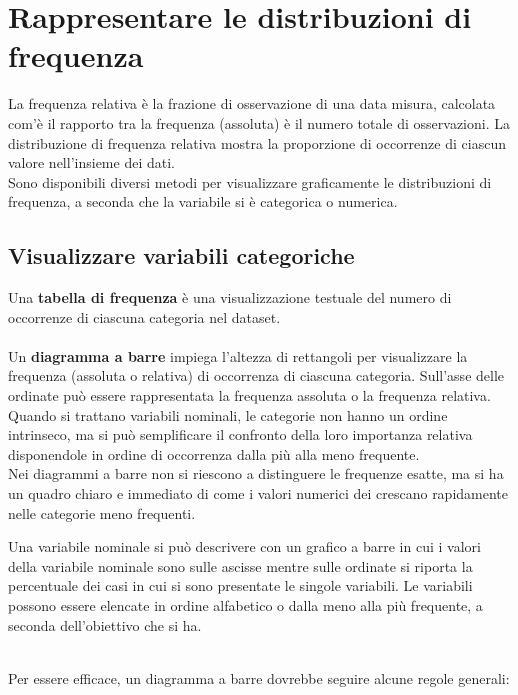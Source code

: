 \documentclass[10pt, draft]{book}
\begin{document}
\section{Rappresentare le distribuzioni di frequenza}
La frequenza relativa è la frazione di osservazione di una data misura, calcolata com'è il rapporto tra la frequenza (assoluta) è il numero totale di osservazioni. La distribuzione di frequenza relativa mostra la proporzione di occorrenze di ciascun valore nell'insieme dei dati.
\\
Sono disponibili diversi metodi per visualizzare graficamente le distribuzioni di frequenza, a seconda che la variabile si è categorica o numerica.

\subsection{Visualizzare variabili categoriche}
Una \textbf{tabella di frequenza} è una visualizzazione testuale del numero di occorrenze di ciascuna categoria nel dataset.
\\
\\
Un \textbf{diagramma a barre} impiega l'altezza di rettangoli per visualizzare la frequenza (assoluta o relativa) di occorrenza di ciascuna categoria. Sull’asse delle ordinate può essere rappresentata la frequenza assoluta o la frequenza relativa.
\\
Quando si trattano variabili nominali, le categorie non hanno un ordine intrinseco, ma si può semplificare il confronto della loro importanza relativa disponendole in ordine di occorrenza dalla più alla meno frequente.
\\
Nei diagrammi a barre non si riescono a distinguere le frequenze esatte, ma si ha un quadro chiaro e immediato di come i valori numerici dei crescano rapidamente nelle categorie meno frequenti. 
\\
\colorbox{lyellow}{\parbox{0.98\textwidth}{Una variabile nominale si può descrivere con un grafico a barre in cui i valori della variabile nominale sono sulle ascisse mentre sulle ordinate si riporta la percentuale dei casi in cui si sono presentate le singole variabili. Le variabili possono essere elencate in ordine alfabetico o dalla meno alla più frequente, a seconda dell’obiettivo che si ha.}}
\\
Per essere efficace, un diagramma a barre dovrebbe seguire alcune regole generali:
\end{document}
